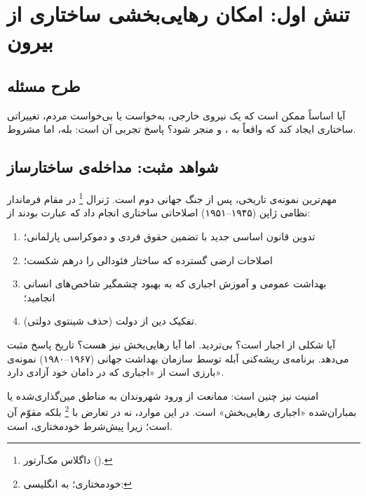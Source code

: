 \section{تنش اول: امکان رهایی‌بخشی ساختاری از بیرون}
\label{sec:ch02-tension1}

\subsection{طرح مسئله}
\label{subsec:ch02-t1-problem}

آیا اساساً ممکن است که یک نیروی خارجی، به‌خواست یا بی‌خواست مردم،
تغییراتی ساختاری ایجاد کند که واقعاً به ،
 و  منجر شود؟ پاسخ تجربی
آن است: بله، اما مشروط.

\subsection{شواهد مثبت: مداخله‌ی ساختارساز}
\label{subsec:ch02-t1-positive}

مهم‌ترین نمونه‌ی تاریخی،  پس از
جنگ جهانی دوم است. ژنرال
%
\footnote{%
	داگلاس مک‌آرتور ().%
}%
در مقام فرماندار نظامی ژاپن (۱۹۴۵--۱۹۵۱) اصلاحاتی ساختاری انجام
داد که عبارت بودند از:

\begin{enumerate}[label=\textbf{\alph*.}, nosep, rightmargin=1em]
	\item تدوین قانون اساسی جدید با تضمین حقوق فردی و دموکراسی
	پارلمانی؛
	\item اصلاحات ارضی گسترده که ساختار فئودالی را درهم
	شکست؛
	\item بهداشت عمومی و آموزش اجباری که به بهبود چشمگیر
	شاخص‌های انسانی انجامید؛
	\item تفکیک دین از دولت (حذف شینتوی دولتی).
\end{enumerate}

\begin{tcolorbox}[casebox,
	title={مطالعه‌ی موردی: بهداشت به‌مثابه‌ی رهایی‌بخشی}]
	
	آیا  شکلی از اجبار است؟ بی‌تردید.
	اما آیا رهایی‌بخش نیز هست؟ تاریخ پاسخ مثبت می‌دهد. برنامه‌ی
	ریشه‌کنی آبله توسط سازمان بهداشت جهانی (۱۹۶۷--۱۹۸۰) نمونه‌ی
	بارزی است از «اجباری که در دامان خود آزادی
	دارد».
	
	امنیت نیز چنین است: ممانعت از ورود شهروندان به مناطق مین‌گذاری‌شده
	یا بمباران‌شده «اجباری رهایی‌بخش» است. در این موارد، 
	نه در تعارض با %
	\footnote{خودمختاری؛ به انگلیسی: }%
	بلکه مقوّم آن است؛ زیرا پیش‌شرط خودمختاری،  است.
\end{tcolorbox}

